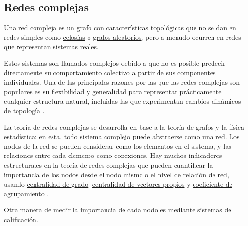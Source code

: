 \subsection{Redes complejas}
\begin{definicion} \label{def:CN}
    Una \href{https://en.wikipedia.org/wiki/Complex_network}{red compleja} 
    es un grafo con características topológicas que no se dan 
    en redes simples como \href{https://en.wikipedia.org/wiki/Lattice_(order)}{celosías} o 
    \href{https://mathworld.wolfram.com/RandomGraph.html}{grafos aleatorios}, pero a menudo ocurren en redes que 
    representan sistemas reales. 
\end{definicion}

Estos sistemas son llamados complejos debido a que no es posible predecir directamente su 
comportamiento colectivo a partir de sus componentes individuales. Una de las principales razones por las que 
las redes complejas son populares es su flexibilidad
y generalidad para representar prácticamente cualquier estructura natural, incluidas las que experimentan 
cambios dinámicos de topología \cite{CN-review}.

La teoría de redes complejas se desarrolla en base a la teoría de grafos y la física estadística; en esta, 
todo sistema complejo puede abstraerse como una red. Los nodos de la red se pueden 
considerar como los elementos en el sistema, y las relaciones
entre cada elemento como conexiones. Hay muchos indicadores estructurales
en la teoría de redes complejas que pueden cuantificar la importancia de los nodos desde el nodo mismo o el
nivel de relación de red, usando \href{https://link.springer.com/10.1007%2F978-1-4419-9863-7_935}{centralidad de grado}, 
\href{https://neo4j.com/docs/graph-data-science/current/algorithms/eigenvector-centrality/}{centralidad de vectores propios} 
y \href{https://en.wikipedia.org/wiki/Clustering_coefficient}{coeficiente de agrupamiento} \cite{albert2002statistical}.
 
Otra manera de medir la importancia de cada nodo es mediante sistemas de calificación.

